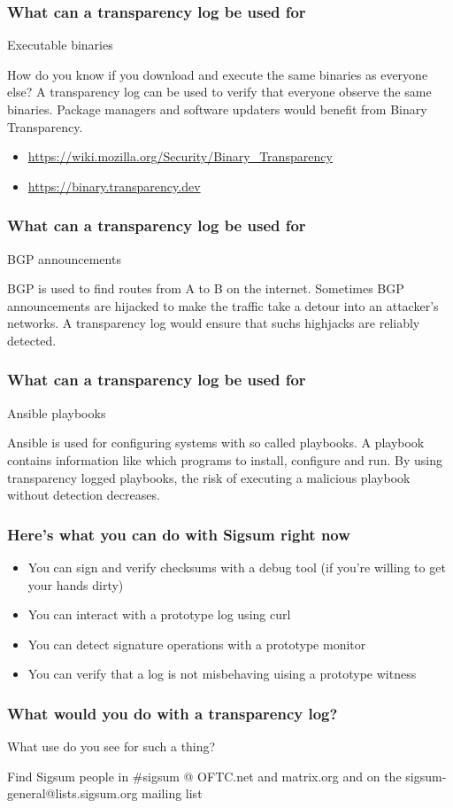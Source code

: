 \begin{frame}
  \frametitle{What can a transparency log be used for}

  Executable binaries
  \pause

  How do you know if you download and execute the same binaries as
  everyone else?  A transparency log can be used to verify that
  everyone observe the same binaries. Package managers and software
  updaters would benefit from Binary Transparency.

  \begin{itemize}
  \item \url{https://wiki.mozilla.org/Security/Binary_Transparency}
  \item \url{https://binary.transparency.dev}
  \end{itemize}
\end{frame}


\begin{frame}
  \frametitle{What can a transparency log be used for}

  BGP announcements
  \pause

  BGP is used to find routes from A to B on the internet. Sometimes
  BGP announcements are hijacked to make the traffic take a detour
  into an attacker's networks. A transparency log would ensure that
  suchs highjacks are reliably detected.
\end{frame}


\begin{frame}
  \frametitle{What can a transparency log be used for}

  Ansible playbooks
  \pause

  Ansible is used for configuring systems with so called playbooks. A
  playbook contains information like which programs to install,
  configure and run. By using transparency logged playbooks, the risk
  of executing a malicious playbook without detection decreases.
\end{frame}

\begin{frame}
  \frametitle{Here's what you can do with Sigsum right now}

  \begin{itemize}
  \item<1-> You can sign and verify checksums with a debug tool (if
    you’re willing to get your hands dirty)
  \item<2-> You can interact with a prototype log using curl
  \item<3-> You can detect signature operations with a prototype
    monitor
  \item<4-> You can verify that a log is not misbehaving uising a
    prototype witness
  \end{itemize}
\end{frame}

\begin{frame}
  \frametitle{What would you do with a transparency log?}

  What use do you see for such a thing?
  \pause

  Find Sigsum people in \#sigsum @ OFTC.net and matrix.org and on the
  sigsum-general@lists.sigsum.org mailing list
\end{frame}
